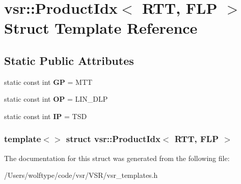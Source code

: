 \hypertarget{structvsr_1_1_product_idx_3_01_r_t_t_00_01_f_l_p_01_4}{\section{vsr\-:\-:Product\-Idx$<$ R\-T\-T, F\-L\-P $>$ Struct Template Reference}
\label{structvsr_1_1_product_idx_3_01_r_t_t_00_01_f_l_p_01_4}
}
\subsection*{Static Public Attributes}
\begin{DoxyCompactItemize}
\item 
\hypertarget{structvsr_1_1_product_idx_3_01_r_t_t_00_01_f_l_p_01_4_aeb93c687079d1a2e9064930281b6d36e}{static const int {\bfseries G\-P} = M\-T\-T}\label{structvsr_1_1_product_idx_3_01_r_t_t_00_01_f_l_p_01_4_aeb93c687079d1a2e9064930281b6d36e}

\item 
\hypertarget{structvsr_1_1_product_idx_3_01_r_t_t_00_01_f_l_p_01_4_ada25736b8431b64aaadd797d5b04e49a}{static const int {\bfseries O\-P} = L\-I\-N\-\_\-\-D\-L\-P}\label{structvsr_1_1_product_idx_3_01_r_t_t_00_01_f_l_p_01_4_ada25736b8431b64aaadd797d5b04e49a}

\item 
\hypertarget{structvsr_1_1_product_idx_3_01_r_t_t_00_01_f_l_p_01_4_a7c2b16235f341fd350650802fe8f6629}{static const int {\bfseries I\-P} = T\-S\-D}\label{structvsr_1_1_product_idx_3_01_r_t_t_00_01_f_l_p_01_4_a7c2b16235f341fd350650802fe8f6629}

\end{DoxyCompactItemize}
\subsubsection*{template$<$$>$ struct vsr\-::\-Product\-Idx$<$ R\-T\-T, F\-L\-P $>$}



The documentation for this struct was generated from the following file\-:\begin{DoxyCompactItemize}
\item 
/\-Users/wolftype/code/vsr/\-V\-S\-R/vsr\-\_\-templates.\-h\end{DoxyCompactItemize}
